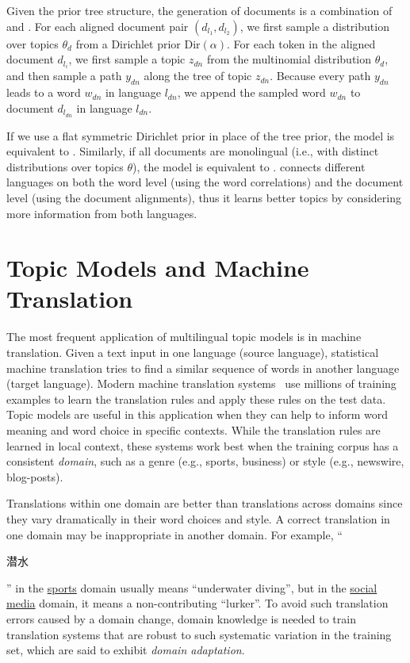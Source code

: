 Given the prior tree structure, the generation of documents is a
combination of \tlda{} and \plda{}.  For each aligned document pair
$(d_{l_1}, d_{l_2})$, we first sample a distribution over topics
$\theta_d$ from a Dirichlet prior $\text{Dir}(\alpha)$.  For each
token in the aligned document $d_{l_i}$, we first sample a topic
$z_{dn}$ from the multinomial distribution $\theta_d$, and then sample
a path $y_{dn}$ along the tree of topic $z_{dn}$. Because every path
$y_{dn}$ leads to a word $w_{dn}$ in language $l_{dn}$, we append the
sampled word $w_{dn}$ to document $d_{l_{dn}}$ in language $l_{dn}$.

If we use a flat symmetric Dirichlet prior in place of the tree prior,
the model is equivalent to \plda{}. Similarly, if all documents are monolingual (i.e., with
distinct distributions over topics $\theta$), the model is equivalent to \tlda{}. \ptlda{} connects different languages on both the word
level (using the word correlations) and the document level (using the
document alignments), thus it learns better topics by considering more
information from both languages.


\section{Topic Models and Machine Translation}
\label{sec:tm-mt}

The most frequent application of multilingual topic models is in machine translation.
Given a text input in one language (source language), statistical
machine translation tries to find a similar sequence of words in another
language (target language). Modern machine translation
systems~\citep{koehn-09} use millions of training examples to learn
the translation rules and apply these rules on the test data. 
Topic models are useful in this application when they can help to inform word meaning and word choice in specific contexts.
While the translation rules are learned in local context, these systems work
best when the training corpus has a consistent \emph{domain}, such as a
 genre (e.g., sports, business) or style (e.g.,
newswire, blog-posts). 

Translations within one domain are better than translations across
domains since they vary dramatically in their word choices and style.
A correct translation in one domain may be inappropriate in another
domain.  For example, ``\begin{CJK*}{UTF8}{gbsn}潜水\end{CJK*}'' in the
  \underline{sports} domain usually means ``underwater diving'', but
  in the \underline{social media} domain, it means a non-contributing
  ``lurker''. To avoid such translation errors caused by a domain
  change, domain knowledge is needed to train translation systems that
  are robust to such systematic variation in the training set, which
  are said to exhibit \emph{domain adaptation}.

